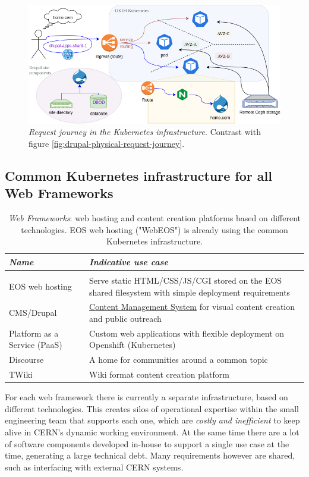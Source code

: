 \begin{figure}
    \centering
    \includegraphics[width=.66\textwidth]{figures/drupal-k8s-request-journey}
    \caption{\emph{Request journey in the Kubernetes infrastructure}. Contrast with figure \ref{fig:drupal-physical-request-journey}.}
    \label{fig:drupal-k8s-request-journey}
\end{figure}

\subsection{Common Kubernetes infrastructure for all Web Frameworks}
\label{sec-web-frameworks}

\begin{table}[h!]
\begin{tabularx}{\textwidth}{ p{10em}| >{\raggedright\arraybackslash}X}
    \emph{Name} & \emph{Indicative use case} \\
    \hline \\
    EOS web hosting & Serve static HTML/CSS/JS/CGI stored on the EOS shared filesystem with simple deployment requirements \\
    CMS/Drupal & \hyperref[what-is-drupal]{Content Management System} for visual content creation and public outreach \\
    Platform as a Service (PaaS) & Custom web applications with flexible deployment on Openshift (Kubernetes) \\
    Discourse & A home for communities around a common topic \\
    TWiki & Wiki format content creation platform
\end{tabularx}
\caption{\emph{Web Frameworks}: web hosting and content creation platforms based on different technologies.
EOS web hosting ("WebEOS") is already using the common Kubernetes infrastructure.}
\label{tab-wf}
\end{table}

For each web framework there is currently a separate infrastructure, based on different technologies.
This creates silos of operational expertise within the small engineering team that supports each one, which are \emph{costly and inefficient} to keep alive in CERN's dynamic working environment.
At the same time there are a lot of software components developed in-house to support a single use case at the time, generating a large technical debt.
Many requirements however are shared, such as interfacing with external CERN systems.

